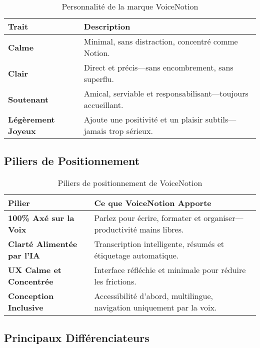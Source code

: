 \begin{table}[H]
    \centering
    \begin{tabular}{|p{4cm}|p{9cm}|}
        \hline
        \textbf{Trait} & \textbf{Description} \\
        \hline
        \textbf{Calme} & Minimal, sans distraction, concentré comme Notion. \\
        \hline
        \textbf{Clair} & Direct et précis—sans encombrement, sans superflu. \\
        \hline
        \textbf{Soutenant} & Amical, serviable et responsabilisant—toujours accueillant. \\
        \hline
        \textbf{Légèrement Joyeux} & Ajoute une positivité et un plaisir subtils—jamais trop sérieux. \\
        \hline
    \end{tabular}
    \caption{Personnalité de la marque VoiceNotion}
    \label{tab:brand_personality}
\end{table}

\subsection{Piliers de Positionnement}

\begin{table}[H]
    \centering
    \begin{tabular}{|p{4cm}|p{9cm}|}
        \hline
        \textbf{Pilier} & \textbf{Ce que VoiceNotion Apporte} \\
        \hline
        \textbf{100\% Axé sur la Voix} & Parlez pour écrire, formater et organiser—productivité mains libres. \\
        \hline
        \textbf{Clarté Alimentée par l'IA} & Transcription intelligente, résumés et étiquetage automatique. \\
        \hline
        \textbf{UX Calme et Concentrée} & Interface réfléchie et minimale pour réduire les frictions. \\
        \hline
        \textbf{Conception Inclusive} & Accessibilité d'abord, multilingue, navigation uniquement par la voix. \\
        \hline
    \end{tabular}
    \caption{Piliers de positionnement de VoiceNotion}
    \label{tab:positioning_pillars}
\end{table}

\subsection{Principaux Différenciateurs}

